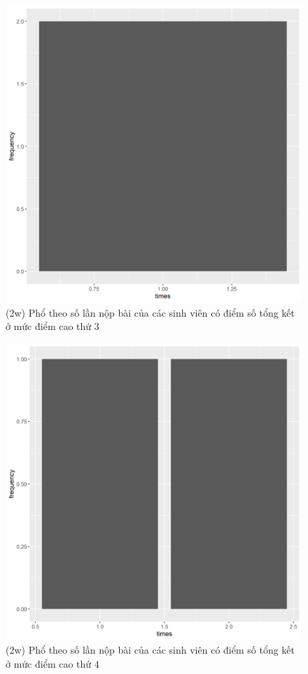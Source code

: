 \documentclass[a4paper]{article}
\theoremstyle{definition}
\begin{document}
\begin{figure}[!ht]
    \centering
    \includegraphics[scale=0.4]{Pics/q2w-3-file2.png}
    \caption{(2w) Phổ theo số lần nộp bài của các sinh viên có điểm số tổng kết ở mức điểm cao thứ $3$}
    \label{fig:my_label}
\end{figure}
\begin{figure}[!ht]
    \centering
    \includegraphics[scale=0.4]{Pics/q2w-4-file2.png}
    \caption{(2w) Phổ theo số lần nộp bài của các sinh viên có điểm số tổng kết ở mức điểm cao thứ $4$}
    \label{fig:my_label}
\end{figure}
\newpage
\end{document}

